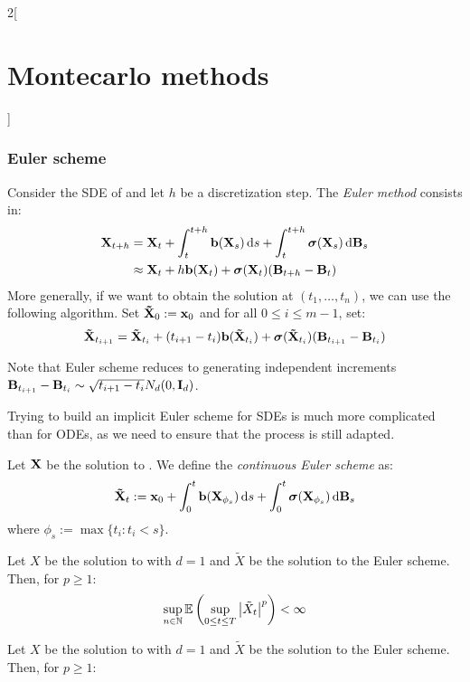 \documentclass[../../../main_math.tex]{subfiles}
\begin{document}
\begin{multicols}{2}[\section{Montecarlo methods}]
  \subsubsection{Euler scheme}
  \begin{definition}
    Consider the SDE of  and let $h$ be a discretization step. The \emph{Euler method} consists in:
    \begin{align*}
      \boldsymbol{\mathrm{X}}_{t+h} & =\boldsymbol{\mathrm{X}}_t+\int_t^{t+h}\boldsymbol{\mathrm{b}}(\boldsymbol{\mathrm{X}}_s)\dd{s}+\int_t^{t+h}\boldsymbol{\mathrm{\sigma}}(\boldsymbol{\mathrm{X}}_s)\dd{\boldsymbol{\mathrm{B}}_s} \\
                   & \approx \boldsymbol{\mathrm{X}}_t+h\boldsymbol{\mathrm{b}}(\boldsymbol{\mathrm{X}}_t)+\boldsymbol{\mathrm{\sigma}}(\boldsymbol{\mathrm{X}}_t)(\boldsymbol{\mathrm{B}}_{t+h}-\boldsymbol{\mathrm{B}}_t)
    \end{align*}
    More generally, if we want to obtain the solution at $(t_1,\dots,t_n)$, we can use the following algorithm. Set $\boldsymbol{\mathrm{\tilde{X}}}_0:=\boldsymbol{\mathrm{x}}_0$ and for all $0\leq i\leq m-1$, set:
    $$
      \boldsymbol{\mathrm{\tilde{X}}}_{t_{i+1}}=\boldsymbol{\mathrm{\tilde{X}}}_{t_i}+(t_{i+1}-t_i)\boldsymbol{\mathrm{b}}(\boldsymbol{\mathrm{\tilde{X}}}_{t_i})+\boldsymbol{\mathrm{\sigma}}(\boldsymbol{\mathrm{\tilde{X}}}_{t_i})(\boldsymbol{\mathrm{B}}_{t_{i+1}}-\boldsymbol{\mathrm{B}}_{t_i})
    $$
  \end{definition}
  \begin{remark}
    Note that Euler scheme reduces to generating independent increments $\boldsymbol{\mathrm{B}}_{t_{i+1}}-\boldsymbol{\mathrm{B}}_{t_i}\sim \sqrt{t_{i+1}-t_i}N_d(0,\boldsymbol{\mathrm{I}}_d)$.
  \end{remark}
  \begin{remark}
    Trying to build an implicit Euler scheme for SDEs is much more complicated than for ODEs, as we need to ensure that the process is still adapted.
  \end{remark}
  \begin{definition}
    Let $\boldsymbol{\mathrm{X}}$ be the solution to . We define the \emph{continuous Euler scheme} as:
    $$
      \boldsymbol{\mathrm{\tilde{X}}}_t:=\boldsymbol{\mathrm{x}}_0+\int_0^t\boldsymbol{\mathrm{b}}(\boldsymbol{\mathrm{X}}_{\phi_s})\dd{s}+\int_0^t\boldsymbol{\mathrm{\sigma}}(\boldsymbol{\mathrm{X}}_{\phi_s})\dd{\boldsymbol{\mathrm{B}}_s}
    $$
    where $\phi_s:=\max\{ t_i: t_i< s\}$.
  \end{definition}
  \begin{lemma}
    Let $X$ be the solution to  with $d=1$ and $\tilde{X}$ be the solution to the Euler scheme. Then, for $p\geq 1$:
    $$
      \sup_{n\in\mathbb{N}}\mathbb{E}\left( \sup_{0\leq t\leq T}\abs{\tilde{X}_t}^p\right)<\infty
    $$
  \end{lemma}
  \begin{lemma}
    Let $X$ be the solution to  with $d=1$ and $\tilde{X}$ be the solution to the Euler scheme. Then, for $p\geq 1$:
    $$
$$
\end{lemma}
\end{multicols}
\end{document}
